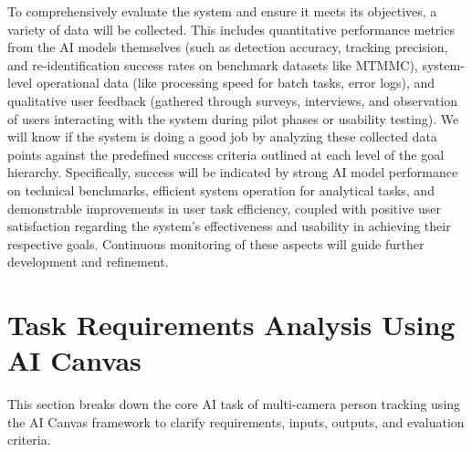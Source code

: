 To comprehensively evaluate the system and ensure it meets its objectives, a variety of data will be collected. This includes quantitative performance metrics from the AI models themselves (such as detection accuracy, tracking precision, and re-identification success rates on benchmark datasets like MTMMC), system-level operational data (like processing speed for batch tasks, error logs), and qualitative user feedback (gathered through surveys, interviews, and observation of users interacting with the system during pilot phases or usability testing). We will know if the system is doing a good job by analyzing these collected data points against the predefined success criteria outlined at each level of the goal hierarchy. Specifically, success will be indicated by strong AI model performance on technical benchmarks, efficient system operation for analytical tasks, and demonstrable improvements in user task efficiency, coupled with positive user satisfaction regarding the system's effectiveness and usability in achieving their respective goals. Continuous monitoring of these aspects will guide further development and refinement.

\section{Task Requirements Analysis Using AI Canvas}
\label{section:task_analysis_aic}
This section breaks down the core AI task of multi-camera person tracking using the AI Canvas framework to clarify requirements, inputs, outputs, and evaluation criteria.

